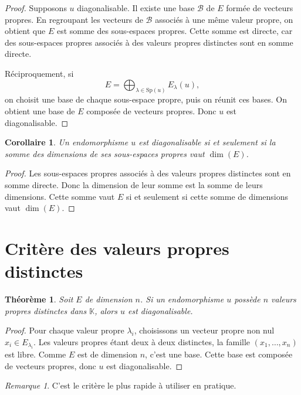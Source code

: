 \documentclass[11pt,a4paper]{article}
\newtheorem{theoreme}[definition]{Théorème}
\newtheorem{corollaire}[definition]{Corollaire}
\theoremstyle{remark}
\newtheorem{remarque}[definition]{Remarque}
\newcommand{\K}{\mathbb{K}}
\newcommand{\Sp}{\mathrm{Sp}}
\begin{document}
\begin{proof}
Supposons \(u\) diagonalisable. Il existe une base \(\mathcal B\) de \(E\) formée de vecteurs propres. En regroupant les vecteurs de \(\mathcal B\) associés à une même valeur propre, on obtient que \(E\) est somme des sous-espaces propres. Cette somme est directe, car des sous-espaces propres associés à des valeurs propres distinctes sont en somme directe.

Réciproquement, si
\[
E=\bigoplus_{\lambda\in\Sp(u)}E_\lambda(u),
\]
on choisit une base de chaque sous-espace propre, puis on réunit ces bases. On obtient une base de \(E\) composée de vecteurs propres. Donc \(u\) est diagonalisable.
\end{proof}

\begin{corollaire}
Un endomorphisme \(u\) est diagonalisable si et seulement si la somme des dimensions de ses sous-espaces propres vaut \(\dim(E)\).
\end{corollaire}

\begin{proof}
Les sous-espaces propres associés à des valeurs propres distinctes sont en somme directe. Donc la dimension de leur somme est la somme de leurs dimensions. Cette somme vaut \(E\) si et seulement si cette somme de dimensions vaut \(\dim(E)\).
\end{proof}

\section{Critère des valeurs propres distinctes}

\begin{theoreme}
Soit \(E\) de dimension \(n\). Si un endomorphisme \(u\) possède \(n\) valeurs propres distinctes dans \(\K\), alors \(u\) est diagonalisable.
\end{theoreme}

\begin{proof}
Pour chaque valeur propre \(\lambda_i\), choisissons un vecteur propre non nul \(x_i\in E_{\lambda_i}\). Les valeurs propres étant deux à deux distinctes, la famille \((x_1,\dots,x_n)\) est libre. Comme \(E\) est de dimension \(n\), c’est une base. Cette base est composée de vecteurs propres, donc \(u\) est diagonalisable.
\end{proof}

\begin{remarque}
C’est le critère le plus rapide à utiliser en pratique.
\end{remarque}
\end{document}
